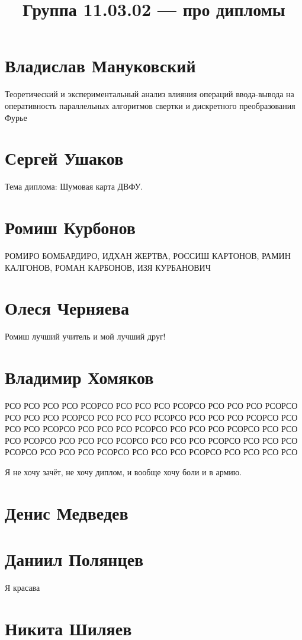 \documentclass{article}
\title{Группа 11.03.02 --- про дипломы}
\begin{document}
\section*{Владислав Мануковский}
Теоретический и экспериментальный анализ влияния операций ввода-вывода на оперативность параллельных алгоритмов свертки и дискретного преобразования Фурье

\section*{Сергей Ушаков}

Тема диплома: Шумовая карта ДВФУ.

\section*{Ромиш Курбонов}

РОМИРО БОМБАРДИРО, ИДХАН ЖЕРТВА, РОССИШ КАРТОНОВ, РАМИН КАЛГОНОВ, РОМАН КАРБОНОВ, ИЗЯ КУРБАНОВИЧ

\section*{Олеся Черняева}
Ромиш лучший учитель и мой лучший друг!

\section*{Владимир Хомяков}
РСО РСО РСО РСО РСОРСО РСО РСО РСО РСОРСО РСО РСО РСО РСОРСО РСО РСО РСО РСОРСО РСО РСО РСО РСОРСО РСО РСО РСО РСОРСО РСО РСО РСО РСОРСО РСО РСО РСО РСОРСО РСО РСО РСО РСОРСО РСО РСО РСО РСОРСО РСО РСО РСО РСОРСО РСО РСО РСО РСОРСО РСО РСО РСО РСОРСО РСО РСО РСО РСОРСО РСО РСО РСО РСОРСО РСО РСО РСО РСО

Я не хочу зачёт, не хочу диплом, и вообще хочу боли и в армию.
\section*{Денис Медведев}

\section*{Даниил Полянцев}
Я красава

\section*{Никита Шиляев}
\end{document}
